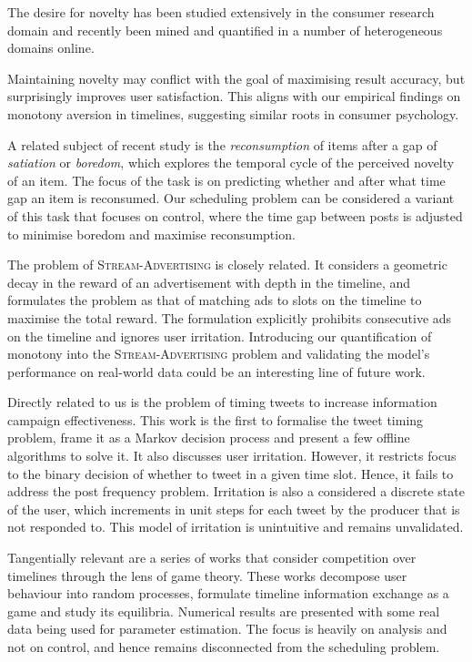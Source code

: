 \documentclass[onesided,letterpaper]{tufte-book}
\begin{document}
The desire for novelty has been studied extensively in the consumer research domain\cite{Kahn1995139} and recently been mined and quantified in a number of heterogeneous domains online\cite{Zhang:2014:MNT:2566486.2567976}.

Maintaining novelty may conflict with the goal of maximising result accuracy, but surprisingly improves user satisfaction\cite{McNee:2006:AEA:1125451.1125659}. This aligns with our empirical findings on monotony aversion in timelines, suggesting similar roots in consumer psychology.

\newpage

A related subject of recent study is the \textit{reconsumption} of items after a gap of \textit{satiation} or \textit{boredom}\cite{Kapoor:2015:JTR:2684822.2685306}\cite{Anderson:2014:DRC:2566486.2568018}, which explores the temporal cycle of the perceived novelty of an item. The focus of the task is on predicting whether and after what time gap an item is reconsumed. Our scheduling problem can be considered a variant of this task that focuses on control, where the time gap between posts is adjusted to minimise boredom and maximise reconsumption.

The problem of \textsc{Stream-Advertising}\cite{Ieong:2014:AS:2566486.2568030} is closely related. It considers a geometric decay in the reward of an advertisement with depth in the timeline, and formulates the problem as that of matching ads to slots on the timeline to maximise the total reward. The formulation explicitly prohibits consecutive ads on the timeline and ignores user irritation. Introducing our quantification of monotony into the \textsc{Stream-Advertising} problem and validating the model's performance on real-world data could be an interesting line of future work.

Directly related to us is the problem of timing tweets to increase information campaign effectiveness\cite{dabeer2011timing}. This work is the first to formalise the tweet timing problem, frame it as a Markov decision process and present a few offline algorithms to solve it. It also discusses user irritation. However, it restricts focus to the binary decision of whether to tweet in a given time slot. Hence, it fails to address the post frequency problem. Irritation is also a considered a discrete state of the user, which increments in unit steps for each tweet by the producer that is not responded to. This model of irritation is unintuitive and remains unvalidated.

Tangentially relevant are a series of works that consider competition over timelines through the lens of game theory\cite{altman2014strategic}\cite{reiffers2014game}. These works decompose user behaviour into random processes, formulate timeline information exchange as a game and study its equilibria. Numerical results are presented with some real data being used for parameter estimation. The focus is heavily on analysis and not on control, and hence remains disconnected from the scheduling problem.
\end{document}
